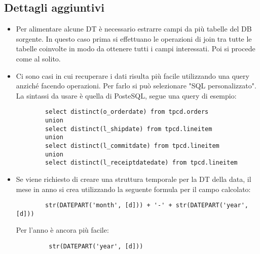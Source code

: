 \subsection{Dettagli aggiuntivi}
\begin{itemize}
	\item Per alimentare alcune DT è necessario estrarre campi da più tabelle del DB sorgente. In questo caso prima si effettuano le operazioni di join tra tutte le tabelle coinvolte in modo da ottenere tutti i campi interessati. Poi si procede come al solito.
	\item Ci sono casi in cui recuperare i dati risulta più facile utilizzando una query anziché facendo operazioni. Per farlo si può selezionare "SQL personalizzato". La sintassi da usare è quella di PosteSQL, segue una query di esempio:
	\begin{verbatim}
		select distinct(o_orderdate) from tpcd.orders
		union
		select distinct(l_shipdate) from tpcd.lineitem
		union
		select distinct(l_commitdate) from tpcd.lineitem
		union
		select distinct(l_receiptdatedate) from tpcd.lineitem
	\end{verbatim}
	\item Se viene richiesto di creare una struttura temporale per la DT della data, il mese in anno si crea utilizzando la seguente formula per il campo calcolato:
	\begin{verbatim}
		str(DATEPART('month', [d])) + '-' + str(DATEPART('year', [d]))
	\end{verbatim}
	Per l'anno è  ancora più facile:
	\begin{verbatim}
		 str(DATEPART('year', [d]))
	\end{verbatim}
\end{itemize}
\newpage

